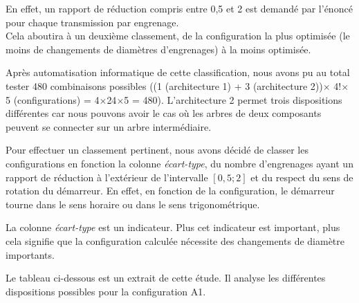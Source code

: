\documentclass{config}
\begin{document}
\begin{spacing}{1.2}
En effet, un rapport de réduction compris entre 0,5 et 2 est demandé par l'énoncé pour chaque transmission par engrenage.\\
Cela aboutira à un deuxième classement, de la configuration la plus optimisée (le moins de changements de diamètres d'engrenages) à la moins optimisée.

Après automatisation informatique de cette classification, nous avons pu au total tester 480 combinaisons possibles ((1 (architecture 1) + 3 (architecture 2))$\times$ 4!$\times$ 5 (configurations) = 4$\times$24$\times$5 = 480). L'architecture 2 permet trois dispositions différentes car nous pouvons avoir le cas où les arbres de deux composants peuvent se connecter sur un arbre intermédiaire.

Pour effectuer un classement pertinent, nous avons décidé de classer les configurations en fonction la colonne \textit{écart-type}, du nombre d'engrenages ayant un rapport de réduction à l'extérieur de l'intervalle $[0,5;2]$ et du respect du sens de rotation du démarreur. En effet, en fonction de la configuration, le démarreur tourne dans le sens horaire ou dans le sens trigonométrique. 

La colonne \textit{écart-type} est un indicateur. Plus cet indicateur est important, plus cela signifie que la configuration calculée nécessite des changements de diamètre importants. 

Le tableau ci-dessous est un extrait de cette étude. Il analyse les différentes dispositions possibles pour la configuration A1.


\end{spacing}
\end{document}
